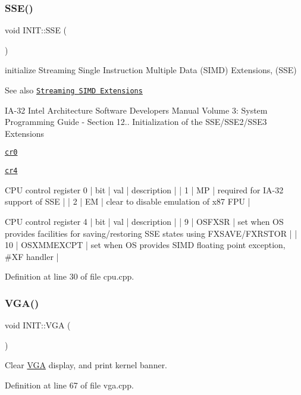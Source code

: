 \mbox{\label{namespace_i_n_i_t_a8928ddbb4ca671dfe1c740da380fa0c4}} 
\subsubsection{\texorpdfstring{S\+S\+E()}{SSE()}}
{\footnotesize\ttfamily void I\+N\+I\+T\+::\+S\+SE (\begin{DoxyParamCaption}{ }\end{DoxyParamCaption})}



initialize Streaming Single Instruction Multiple Data (S\+I\+MD) Extensions, (S\+SE) 

\begin{DoxySeeAlso}{See also}
\href{https://en.wikipedia.org/wiki/Streaming_SIMD_Extensions}{\tt Streaming S\+I\+MD Extensions}

I\+A-\/32 Intel Architecture Software Developer\textquotesingle{}s Manual Volume 3\+: System Programming Guide -\/ Section 12.. Initialization of the S\+S\+E/\+S\+S\+E2/\+S\+S\+E3 Extensions 

\href{https://en.wikipedia.org/wiki/Control_register#CR0}{\tt cr0} 

\href{https://en.wikipedia.org/wiki/Control_register#CR4}{\tt cr4}
\end{DoxySeeAlso}
\begin{DoxyVerb}CPU control register 0
| bit | val | description                           |
|   1 |  MP | required for IA-32 support of SSE     |
|   2 |  EM | clear to disable emulation of x87 FPU |

CPU control register 4
| bit |        val | description                                                                          |
|   9 |     OSFXSR | set when OS provides facilities for saving/restoring SSE states using FXSAVE/FXRSTOR |
|  10 | OSXMMEXCPT | set when OS provides SIMD floating point exception, #XF handler                      |
\end{DoxyVerb}
 

Definition at line 30 of file cpu.\+cpp.

\mbox{\label{namespace_i_n_i_t_abae5789d80f8edd37455f3b167779654}} 
\subsubsection{\texorpdfstring{V\+G\+A()}{VGA()}}
{\footnotesize\ttfamily void I\+N\+I\+T\+::\+V\+GA (\begin{DoxyParamCaption}{ }\end{DoxyParamCaption})}



Clear \hyperlink{namespace_v_g_a}{V\+GA} display, and print kernel banner. 



Definition at line 67 of file vga.\+cpp.

